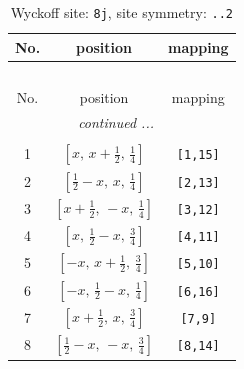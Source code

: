 \documentclass[fleqn,8pt]{jsarticle}
\begin{document}
\begin{longtable}{ccc}
\caption{Wyckoff site: {\tt 8j}, site symmetry: {\tt ..2}}
 \\
 \hline \hline
No. & position & mapping \\ \hline \endfirsthead

\multicolumn{2}{l}{\tablename\ \thetable{}} \\
 \hline \hline
No. & position & mapping \\ \hline \endhead

 \hline \hline
\multicolumn{2}{r}{\footnotesize\it continued ...} \\ \endfoot

 \hline \hline
\multicolumn{2}{r}{} \\ \endlastfoot

1 & $\left[ x,\, x + \frac{1}{2},\, \frac{1}{4} \right]$ & {\tt [1,15]} \\ \hline
2 & $\left[ \frac{1}{2} - x,\, x,\, \frac{1}{4} \right]$ & {\tt [2,13]} \\ \hline
3 & $\left[ x + \frac{1}{2},\, - x,\, \frac{1}{4} \right]$ & {\tt [3,12]} \\ \hline
4 & $\left[ x,\, \frac{1}{2} - x,\, \frac{3}{4} \right]$ & {\tt [4,11]} \\ \hline
5 & $\left[ - x,\, x + \frac{1}{2},\, \frac{3}{4} \right]$ & {\tt [5,10]} \\ \hline
6 & $\left[ - x,\, \frac{1}{2} - x,\, \frac{1}{4} \right]$ & {\tt [6,16]} \\ \hline
7 & $\left[ x + \frac{1}{2},\, x,\, \frac{3}{4} \right]$ & {\tt [7,9]} \\ \hline
8 & $\left[ \frac{1}{2} - x,\, - x,\, \frac{3}{4} \right]$ & {\tt [8,14]} \\
\end{longtable}
\renewcommand{\arraystretch}{1.2}
\end{document}
